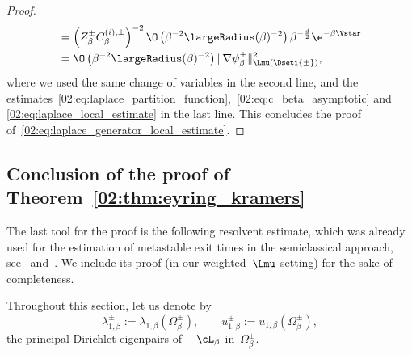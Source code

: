 \begin{proof}
\begin{equation}
\begin{aligned}
                &=\left(Z_\beta^{\pm}C_\beta^{(i),\pm}\right)^{-2}\O\left(\beta^{-2}\largeRadius(\beta)^{-2}\right)\beta^{-\frac d2}\e^{-\beta \Vstar}\\
                &=\O\left(\beta^{-2}\largeRadius(\beta)^{-2}\right)\|\nabla \psi_\beta^\pm\|^2_{\Lmu(\Dseti{\pm})},
                \end{aligned}
            \end{equation}
            where we used the same change of variables in the second line, and the estimates~\eqref{02:eq:laplace_partition_function},~\eqref{02:eq:c_beta_asymptotic} and \eqref{02:eq:laplace_local_estimate} in the last line.
            This concludes the proof of~\eqref{02:eq:laplace_generator_local_estimate}.
        \end{proof}

        \subsection{Conclusion of the proof of Theorem~\ref{02:thm:eyring_kramers}}
        \label{02:subsec:eyring_kramers_final_proof}
        The last tool for the proof is the following resolvent estimate, which was already used for the estimation of metastable exit times in the semiclassical approach, see~\cite[Proposition 27]{LPN21} and~\cite[Proposition 3.4]{LRS24}.
        We include its proof (in our weighted~$\Lmu$ setting) for the sake of completeness.

        Throughout this section, let us denote by
        \[\lambda_{1,\beta}^{\pm} := \lambda_{1,\beta}(\Omega_\beta^\pm),\qquad u_{1,\beta}^\pm := u_{1,\beta}(\Omega_\beta^\pm),\]
        the principal Dirichlet eigenpairs of~$-\cL_\beta$ in~$\Omega_\beta^\pm$.

